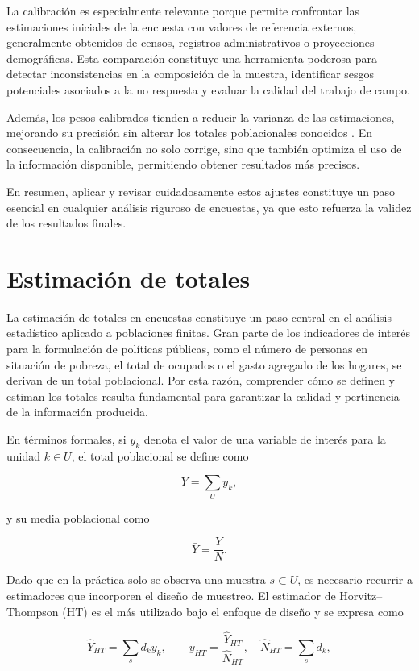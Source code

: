 \documentclass[
  spanish,
  12pt,
]{book}
\begin{document}
La calibración es especialmente relevante porque permite confrontar las estimaciones iniciales de la encuesta con valores de referencia externos, generalmente obtenidos de censos, registros administrativos o proyecciones demográficas. Esta comparación constituye una herramienta poderosa para detectar inconsistencias en la composición de la muestra, identificar sesgos potenciales asociados a la no respuesta y evaluar la calidad del trabajo de campo.

Además, los pesos calibrados tienden a reducir la varianza de las estimaciones, mejorando su precisión sin alterar los totales poblacionales conocidos \citep{sarndal2005nonresponse}. En consecuencia, la calibración no solo corrige, sino que también optimiza el uso de la información disponible, permitiendo obtener resultados más precisos.

En resumen, aplicar y revisar cuidadosamente estos ajustes constituye un paso esencial en cualquier análisis riguroso de encuestas, ya que esto refuerza la validez de los resultados finales.

\section{Estimación de totales}\label{estimaciuxf3n-de-totales}

La estimación de totales en encuestas constituye un paso central en el análisis estadístico aplicado a poblaciones finitas. Gran parte de los indicadores de interés para la formulación de políticas públicas, como el número de personas en situación de pobreza, el total de ocupados o el gasto agregado de los hogares, se derivan de un total poblacional. Por esta razón, comprender cómo se definen y estiman los totales resulta fundamental para garantizar la calidad y pertinencia de la información producida.

En términos formales, si \(y_k\) denota el valor de una variable de interés para la unidad \(k \in U\), el total poblacional se define como

\[
Y = \sum_{U} y_k,
\]

y su media poblacional como

\[
\bar{Y} = \frac{Y}{N}.
\]

Dado que en la práctica solo se observa una muestra \(s \subset U\), es necesario recurrir a estimadores que incorporen el diseño de muestreo. El estimador de Horvitz--Thompson (HT) es el más utilizado bajo el enfoque de diseño y se expresa como

\[
\hat{Y}_{HT} = \sum_{s} d_k y_k, \qquad \bar{y}_{HT} = \frac{\hat{Y}_{HT}}{\hat{N}_{HT}}, \quad \hat{N}_{HT} = \sum_{s} d_k,
\]
\end{document}

